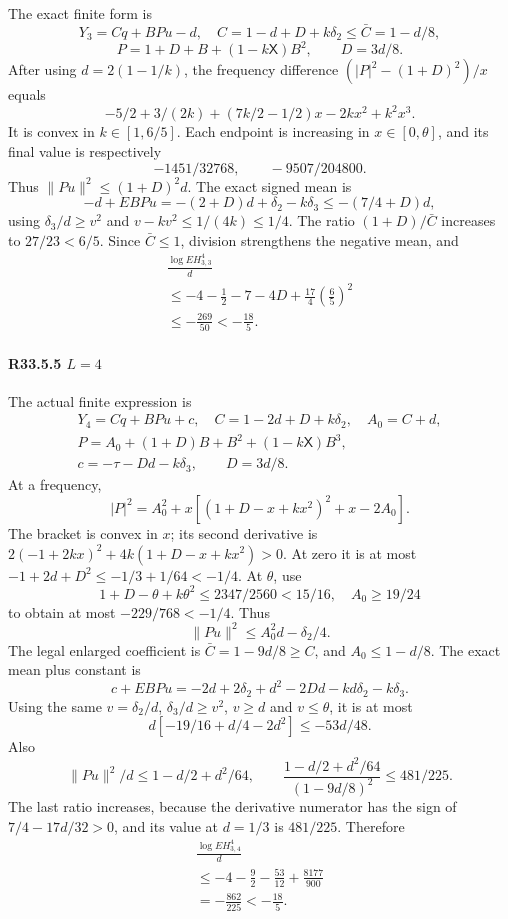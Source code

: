 The exact finite form is
\[
Y_3=Cq+BPu-d,\quad
C=1-d+D+k\delta_2\le\bar C=1-d/8,
\]
\[
P=1+D+B+(1-k\mathsf X)B^2,\qquad D=3d/8.
\]
After using \(d=2(1-1/k)\), the frequency difference
\((|P|^2-(1+D)^2)/x\) equals
\[
-5/2+3/(2k)+(7k/2-1/2)x-2kx^2+k^2x^3.
\]
It is convex in \(k\in[1,\allowbreak \allowbreak  6/5]\). Each endpoint is increasing in
\(x\in[0,\allowbreak \allowbreak  \theta]\), and its final value is respectively
\[
-1451/32768,\qquad -9507/204800.
\]
Thus \(\|Pu\|^2\le(1+D)^2d\).
The exact signed mean is
\[
-d+EBPu=-(2+D)d+\delta_2-k\delta_3\le-(7/4+D)d,
\]
using \(\delta_3/d\ge v^2\) and \(v-kv^2\le1/(4k)\le1/4\).
The ratio \((1+D)/\bar C\) increases to \(27/23<6/5\).
Since \(\bar C\le1\), division strengthens the negative mean, and
\[
\begin{gathered}
\frac{\log EH_{3,3}^4}{d}\\
\le-4-\frac12-7-4D+\frac{17}{4}\left(\frac65\right)^2\\
\le-\frac{269}{50}<-\frac{18}{5}.
\end{gathered}\tag{R33.A31}
\]

\paragraph{R33.5.5 \(L=4\)}

The actual finite expression is
\[
\begin{gathered}
Y_4=Cq+BPu+c,\quad C=1-2d+D+k\delta_2,\quad A_0=C+d,\\
P=A_0+(1+D)B+B^2+(1-k\mathsf X)B^3,\\
c=-\tau-Dd-k\delta_3,\qquad D=3d/8.
\end{gathered}
\]
At a frequency,
\[
|P|^2=A_0^2+x[(1+D-x+kx^2)^2+x-2A_0].
\]
The bracket is convex in \(x\); its second derivative is
\(2(-1+2kx)^2+4k(1+D-x+kx^2)>0\).
At zero it is at most
\(-1+2d+D^2\le-1/3+1/64<-1/4\).
At \(\theta\), use
\[
1+D-\theta+k\theta^2\le2347/2560<15/16,\quad A_0\ge19/24
\]
to obtain at most \(-229/768<-1/4\). Thus
\[
\|Pu\|^2\le A_0^2d-\delta_2/4.
\]
The legal enlarged coefficient is \(\bar C=1-9d/8\ge C\), and
\(A_0\le1-d/8\). The exact mean plus constant is
\[
c+EBPu=-2d+2\delta_2+d^2-2Dd-kd\delta_2-k\delta_3.
\]
Using the same \(v=\delta_2/d\), \(\delta_3/d\ge v^2\), \(v\ge d\) and
\(v\le\theta\), it is at most
\[
d[-19/16+d/4-2d^2]\le-53d/48.
\]
Also
\[
\|Pu\|^2/d\le1-d/2+d^2/64,\qquad
\frac{1-d/2+d^2/64}{(1-9d/8)^2}\le481/225.
\]
The last ratio increases, because the derivative numerator has the
sign of \(7/4-17d/32>0\), and its value at \(d=1/3\) is \(481/225\).
Therefore
\[
\begin{gathered}
\frac{\log EH_{3,4}^4}{d}\\
\le-4-\frac92-\frac{53}{12}+\frac{8177}{900}\\
=-\frac{862}{225}<-\frac{18}{5}.
\end{gathered}\tag{R33.A32}
\]

